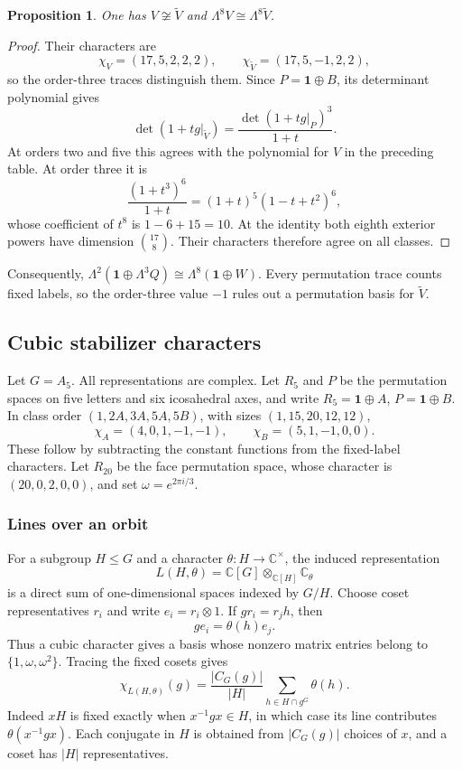 \documentclass[11pt,a4paper]{article}
\newtheorem{proposition}{Proposition}[section]
\begin{document}
\begin{proposition}\label{prop:triples-alternative}
One has $V\not\cong\widetilde V$ and
$\Lambda^8V\cong\Lambda^8\widetilde V$.
\end{proposition}

\begin{proof}
Their characters are
\[
\chi_V=(17,5,2,2,2),\qquad
\chi_{\widetilde V}=(17,5,-1,2,2),
\]
so the order-three traces distinguish them. Since
$P=\mathbf1\oplus B$, its determinant polynomial gives
\[
\det(1+tg|_{\widetilde V})
=\frac{\det(1+tg|_P)^3}{1+t}.
\]
At orders two and five this agrees with the polynomial for $V$ in
the preceding table. At order three it is
\[
\frac{(1+t^3)^6}{1+t}=(1+t)^5(1-t+t^2)^6,
\]
whose coefficient of $t^8$ is $1-6+15=10$. At the identity both eighth
exterior powers have dimension $\binom{17}{8}$. Their characters
therefore agree on all classes.
\end{proof}

Consequently,
$\Lambda^2(\mathbf1\oplus\Lambda^3Q)
\cong\Lambda^8(\mathbf1\oplus W)$.
Every permutation trace counts fixed labels, so the order-three value
$-1$ rules out a permutation basis for $\widetilde V$.

\subsection{Cubic stabilizer characters}\label{subsec:A7}

Let $G=A_5$. All representations are complex. Let $R_5$ and $P$ be
the permutation spaces on five letters and six icosahedral axes, and
write $R_5=\mathbf1\oplus A$, $P=\mathbf1\oplus B$.
In class order $(1,2A,3A,5A,5B)$, with sizes $(1,15,20,12,12)$,
\[
\chi_A=(4,0,1,-1,-1),\qquad \chi_B=(5,1,-1,0,0).
\]
These follow by subtracting the constant functions from the fixed-label
characters. Let $R_{20}$ be the face permutation space, whose character
is $(20,0,2,0,0)$, and set $\omega=e^{2\pi i/3}$.

\subsubsection*{Lines over an orbit}

For a subgroup $H\leq G$ and a character
$\theta:H\to\mathbb C^\times$, the induced representation
\[
L(H,\theta)=\mathbb C[G]\otimes_{\mathbb C[H]}\mathbb C_\theta
\]
is a direct sum of one-dimensional spaces indexed by $G/H$.
Choose coset representatives $r_i$ and write $e_i=r_i\otimes1$.
If $g r_i=r_jh$, then
\[
g e_i=\theta(h)e_j.
\]
Thus a cubic character gives a basis whose nonzero matrix entries
belong to $\{1,\omega,\omega^2\}$. Tracing the fixed cosets gives
\begin{equation}\label{eq:lines-induced-character}
\chi_{L(H,\theta)}(g)
=\frac{|C_G(g)|}{|H|}\sum_{h\in H\cap g^G}\theta(h).
\end{equation}
Indeed $xH$ is fixed exactly when $x^{-1}gx\in H$, in which case its
line contributes $\theta(x^{-1}gx)$. Each conjugate in $H$ is obtained
from $|C_G(g)|$ choices of $x$, and a coset has $|H|$ representatives.
\end{document}
